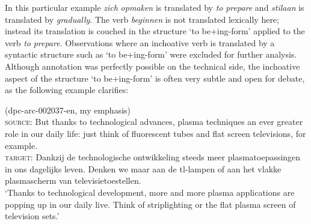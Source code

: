 \begin{enumerate}
In this particular example \textit{zich} \textit{opmaken} is translated by \textit{to} \textit{prepare} and \textit{stilaan} is translated by \textit{gradually}. The verb \textit{beginnen} is not translated lexically here; instead its translation is couched in the structure ‘to be+ing-form’ applied to the verb \textit{to} \textit{prepare}. Observations where an inchoative verb is translated by a syntactic structure such as `to be+ing-form' were excluded for further analysis. Although annotation was perfectly possible on the technical side, the inchoative aspect of the structure ‘to be+ing-form’ is often very subtle \citep{smith_parameter_1997} and open for debate, as the following example  clarifies:

\ea (dpc-arc-002037-en, my emphasis)\label{ex:3:4}\\
\textsc{source:} But thanks to technological advances, plasma techniques  an ever greater role in our daily life: just think of fluorescent tubes and flat screen televisions, for example.\smallskip\\
\textsc{target:} Dankzij de technologische ontwikkeling  steeds meer plasmatoepassingen  in ons dagelijks leven. Denken we maar aan de tl-lampen of aan het vlakke plasmascherm van televisietoestellen.\\\relax
\ob`Thanks to technological development, more and more plasma applications are popping up in our daily live. Think of striplighting or the flat plasma screen of television sets.'\cb
\z\pagebreak


\end{enumerate}
